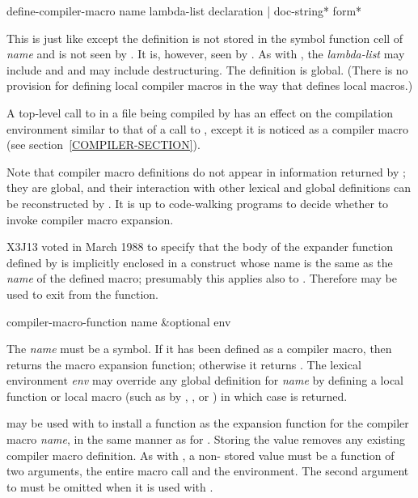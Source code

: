 \begin{defmac}
define-compiler-macro name lambda-list
                      {declaration | doc-string}* {form}*

  This is just like  except the definition is not stored in the
  symbol function cell of \emph{name} and is not seen by .
  It is, however, seen by .  As with , the
  \emph{lambda-list} may include  and 
  and may include destructuring.  The definition is
  global.  (There is no provision for defining local compiler
  macros in the way that  defines local macros.)

  A top-level call to  in a file being compiled by
   has an effect on the compilation environment similar to
  that of a call to , except it is noticed as a
  compiler macro (see section~\ref{COMPILER-SECTION}).

Note that compiler macro definitions do not appear in information returned by
; they are global, and their interaction
with other lexical and global definitions can be reconstructed by
.  It is up to code-walking programs to decide
whether to invoke compiler macro expansion.


\begin{newer}
X3J13 voted in March 1988 
to specify that the body of the expander function defined
by  is implicitly enclosed in a  construct
whose name is the same as the \emph{name} of the defined macro;
presumably this applies also to .
Therefore  may be used to exit from the function.
\end{newer}

\end{defmac}

\begin{defun}[Function]
compiler-macro-function name &optional env

  The \emph{name} must be a symbol.
  If it has been defined as a compiler macro, then
   returns the macro expansion
  function; otherwise it returns .  The
  lexical environment \emph{env} may override any global definition for \emph{name}
  by defining a local function or local macro (such as by , , or
  ) in which case  is returned.

   may be used with  to install a function as
  the expansion function for the compiler macro \emph{name}, in the same manner as for
  .  Storing the value  removes any existing
  compiler macro definition.  As with , a non- stored value
  must be a function of two arguments, the entire macro call and 
  the environment.  The second argument to  must
  be omitted when it is used with .
\end{defun}

